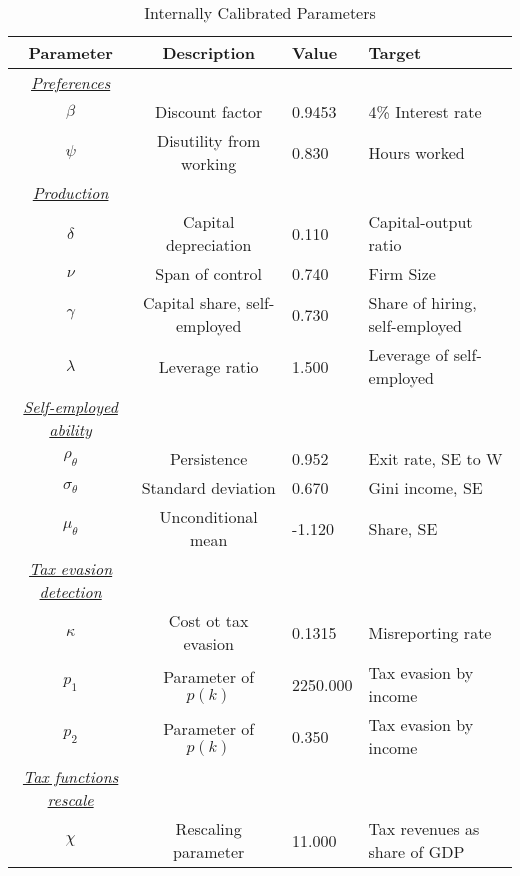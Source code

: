 \documentclass[a4paper,10pt]{article}
\begin{document}
 
\begin{table}[htbp] \centering 
\caption{Internally Calibrated Parameters} 
\label{table:parameters_inside} 
\begin{tabular}{ccll} \hline 
Parameter & Description & Value & Target \\ 
\hline \hline 
\textit{\underline{Preferences}} &  & &  \\  
$\beta$ & Discount factor &   0.9453 & 4\% Interest rate \\ 
$\psi$ & Disutility from working &    0.830 & Hours worked \\ 
\textit{\underline{Production}} &  & &  \\  
$\delta$ & Capital depreciation &    0.110 & Capital-output ratio \\ 
$\nu$ & Span of control &    0.740 & Firm Size \\ 
$\gamma$ & Capital share, self-employed &    0.730 & Share of hiring, self-employed \\ 
$\lambda$ & Leverage ratio &    1.500 & Leverage of self-employed \\ 
\textit{\underline{Self-employed ability}} &  & &  \\  
$\rho_{\theta}$   & Persistence        &    0.952 & Exit rate, SE to W \\ 
$\sigma_{\theta}$ & Standard deviation &    0.670 & Gini income, SE \\ 
$\mu_{\theta}     $ & Unconditional mean &   -1.120 & Share, SE \\ [0.5ex] 
\textit{\underline{Tax evasion detection}} &  & &  \\  
$\kappa$ & Cost ot tax evasion &   0.1315 & Misreporting rate \\ 
$p_{1}$ & Parameter of $p(k)$   & 2250.000 & Tax evasion by income \\ 
$p_{2}$ & Parameter of $p(k)$   &    0.350 & Tax evasion by income \\ 
\textit{\underline{Tax functions rescale}} &  & &  \\  
$\chi$  & Rescaling parameter       &   11.000 & Tax revenues as share of GDP \\ 
\hline \hline 
 \end{tabular} 
\end{table} 
\end{document}
